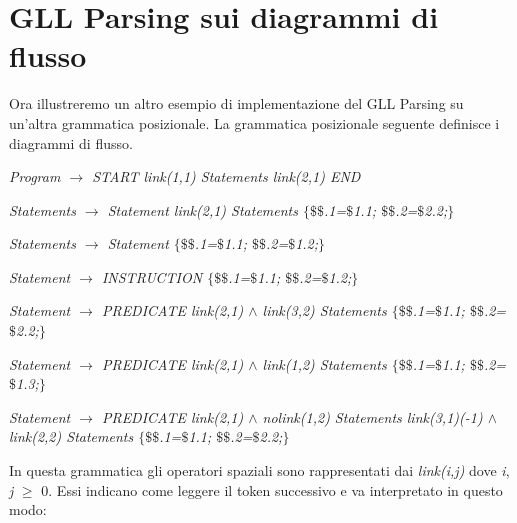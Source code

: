 \section{GLL Parsing sui diagrammi di flusso}
Ora illustreremo un altro esempio di implementazione del GLL Parsing su un'altra grammatica posizionale. La grammatica posizionale seguente definisce i diagrammi di flusso.\par
\begin{center}
	\textit{Program $\to$ START link(1,1) Statements link(2,1) END} \par
	\textit{Statements $\to$ Statement link(2,1) Statements $\{$$\$\$$.1=$\$$1.1; $\$\$$.2=$\$$2.2;$\}$} \par
	\textit{Statements $\to$ Statement $\{$$\$\$$.1=$\$$1.1; $\$\$$.2=$\$$1.2;$\}$}\par
	\textit{Statement $\to$ INSTRUCTION $\{$$\$\$$.1=$\$$1.1; $\$\$$.2=$\$$1.2;$\}$}\par
	\textit{Statement $\to$ PREDICATE link(2,1) $\wedge$ link(3,2) Statements $\{$$\$\$$.1=$\$$1.1; $\$\$$.2=$\$$2.2;$\}$}\par
	\textit{Statement $\to$ PREDICATE  link(2,1) $\wedge$ link(1,2) Statements $\{$$\$\$$.1=$\$$1.1; $\$\$$.2=$\$$1.3;$\}$}\par
	\textit{Statement $\to$ PREDICATE  link(2,1) $\wedge$ nolink(1,2) Statements link(3,1)(-1) $\wedge$ link(2,2) Statements $\{$$\$\$$.1=$\$$1.1; $\$\$$.2=$\$$2.2;$\}$}\par
\end{center}
In questa grammatica gli operatori spaziali sono rappresentati dai \textit{link(i,j)} dove \textit{i}, \textit{j} $\geq$ 0. Essi indicano come leggere il token successivo e va interpretato in questo modo: 
